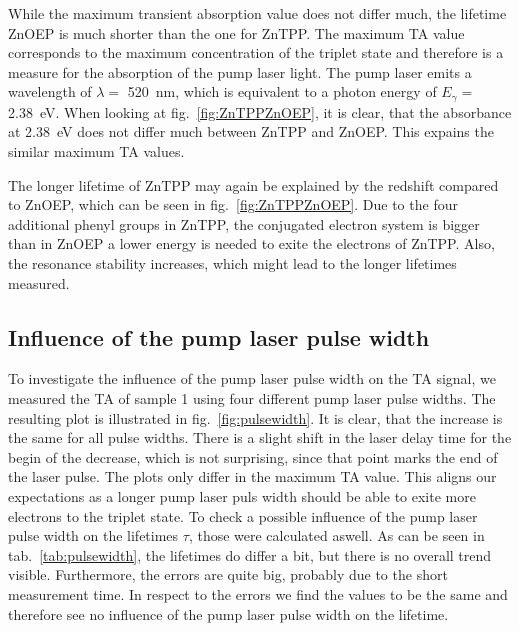 While the maximum transient absorption value does not differ much, the lifetime ZnOEP is much shorter than the one for ZnTPP. The maximum TA value corresponds to the maximum concentration of the triplet state and therefore is a measure for the absorption of the pump laser light. The pump laser emits a wavelength of $\lambda = $ \SI{520}{\nano\metre}, which is equivalent to a photon energy of $E_{\gamma} = $ \SI{2.38}{\eV}. When looking at fig.~\ref{fig:ZnTPPZnOEP}, it is clear, that the absorbance at \SI{2.38}{\eV} does not differ much between ZnTPP and ZnOEP. This expains the similar maximum TA values. \par 
The longer lifetime of ZnTPP may again be explained by the redshift compared to ZnOEP, which can be seen in fig.~\ref{fig:ZnTPPZnOEP}. Due to the four additional phenyl groups in ZnTPP, the conjugated electron system is bigger than in ZnOEP a lower energy is needed to exite the electrons of ZnTPP. Also, the resonance stability increases, which might lead to the longer lifetimes measured.

\subsection*{Influence of the pump laser pulse width}
To investigate the influence of the pump laser pulse width on the TA signal, we measured the TA of sample 1 using four different pump laser pulse widths. The resulting plot is illustrated in fig.~\ref{fig:pulsewidth}. It is clear, that the increase is the same for all pulse widths. There is a slight shift in the laser delay time for the begin of the decrease, which is not surprising, since that point marks the end of the laser pulse. The plots only differ in the maximum TA value. This aligns our expectations as a longer pump laser puls width should be able to exite more electrons to the triplet state. To check a possible influence of the pump laser pulse width on the lifetimes $\tau$, those were calculated aswell. As can be seen in tab.~\ref{tab:pulsewidth}, the lifetimes do differ a bit, but there is no overall trend visible. Furthermore, the errors are quite big, probably due to the short measurement time. In respect to the errors we find the values to be the same and therefore see no influence of the pump laser pulse width on the lifetime.

